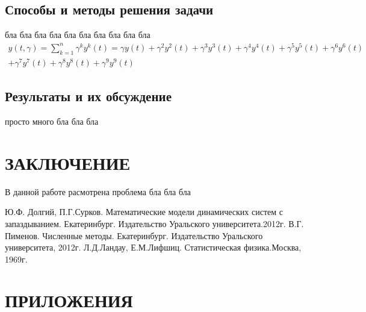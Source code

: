 \documentclass[12pt]{article}
\begin{document}
\subsection{Способы и методы решения задачи}
бла бла бла бла бла бла бла бла бла бла
\begin{multline}
      y(t,\gamma)=\sum_{k=1}^n \gamma^k y^k (t)= \gamma y(t)+\gamma^2 y^2(t)+\gamma^3 y^3(t)+\gamma^4 y^4 (t)  + \gamma^5 y^5(t)+\gamma^6 y^6(t) \\+\gamma^7 y^7(t) +\gamma^8 y^8(t)+\gamma^9 y^9(t)
 \label{math/2}
  \end{multline}
\subsection{Результаты и их обсуждение}

просто много бла бла бла
\section*{ЗАКЛЮЧЕНИЕ}

В данной работе расмотрена проблема бла бла бла

\begin{thebibliography}{5}
    Ю.Ф. Долгий, П.Г.Сурков. Математические модели динамических систем с запаздыванием. Екатеринбург. Издательство Уральского университета.2012г.
    В.Г. Пименов. Численные методы. Екатеринбург. Издательство Уральского университета, 2012г.
    Л.Д.Ландау, Е.М.Лифшиц. Статистическая физика.Москва, 1969г.
    \end{thebibliography}

\appendix

\section*{ПРИЛОЖЕНИЯ}
\end{document}
